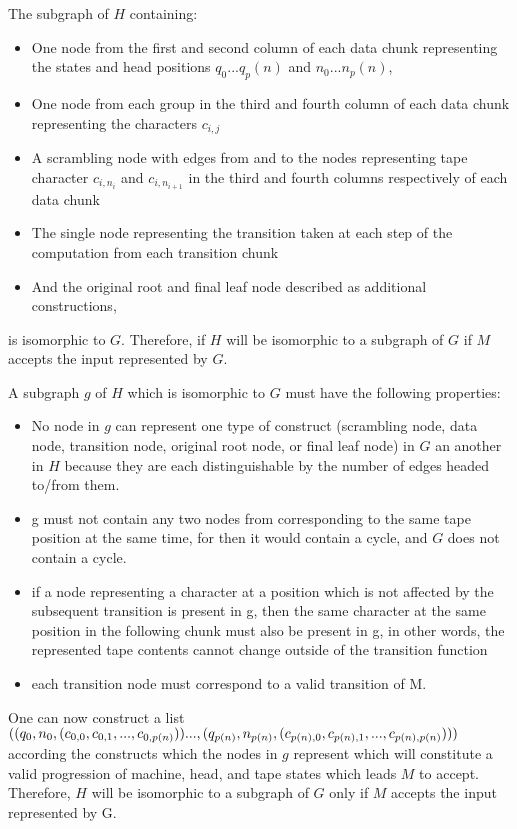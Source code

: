 \documentclass[12pt]{article}
\begin{document}
The subgraph of $H$ containing:
\begin{itemize}
	\item One node from the first and second column of each data chunk representing the states and head positions $q_0...q_p(n)$ and $n_0...n_p(n)$,
	\item One node from each group in the third and fourth column of each data chunk representing the characters $c_{i,j}$
	\item A scrambling node with edges from and to the nodes representing tape character $c_{i,n_i}$ and $c_{i,n_{i+1}}$ in the third and fourth columns respectively of each data chunk
	\item The single node representing the transition taken at each step of the computation from each transition chunk
	\item And the original root and final leaf node described as additional constructions,
\end{itemize}
is isomorphic to $G$. Therefore, if $H$ will be isomorphic to a subgraph of $G$ if $M$ accepts the input represented by $G$.

\vspace{10px}

A subgraph $g$ of $H$ which is isomorphic to $G$ must have the following properties:
\begin{itemize}
	\item No node in $g$ can represent one type of construct (scrambling node, data node, transition node, original root node, or final leaf node) in $G$ an another in $H$ because they are each distinguishable by the number of edges headed to/from them.
	\item g must not contain any two nodes from corresponding to the same tape position at the same time, for then it would contain a cycle, and $G$ does not contain a cycle.
	\item if a node representing a character at a position which is not affected by the subsequent transition is present in g, then the same character at the same position in the following chunk must also be present in g, in other words, the represented tape contents cannot change outside of the transition function
	\item each transition node must correspond to a valid transition of M.
\end{itemize}
One can now construct a list $((q_0, n_0, (c_{0,0}, c_{0,1}, ..., c_{0,p(n)})) ..., (q_{p(n)}, n_{p(n)},\\(c_{p(n),0}, c_{p(n),1}, ..., c_{p(n),p(n)})))$ according the constructs which the nodes in $g$ represent which will constitute a valid progression of machine, head, and tape states which leads $M$ to accept. Therefore, $H$ will be isomorphic to a subgraph of $G$ only if $M$ accepts the input represented by G.
\end{document}

